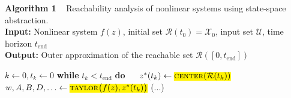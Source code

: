 \algruletop{}
\textbf{Algorithm 1} ~ Reachability analysis of nonlinear systems using state-space abstraction. \\
\textbf{Input:} Nonlinear system $f(z)$, initial set $\mathcal{R}(t_0) = \mathcal{X}_0$, input set $\mathcal{U}$, time horizon $t_{\text{end}}$ \\
\textbf{Output:} Outer approximation of the reachable set $\mathcal{R}([0,t_{\text{end}}])$

\begin{algorithmic}[1]
	\State $k \gets 0, t_k \gets 0$
	\State \textbf{while} $t_k < t_{\text{end}}$ \textbf{do}
	\State $\quad$ $z^*(t_k) \gets \highlightpartmath{\textsc{center}(\mathcal{R}(t_k))}$
	\State $\quad$ $w, A, B, D, \ldots \gets \highlightpartmath{\textsc{taylor}\big(f(z), z^*(t_k)\big)}$
	\State (...)
\end{algorithmic}
\algrulebottom{}